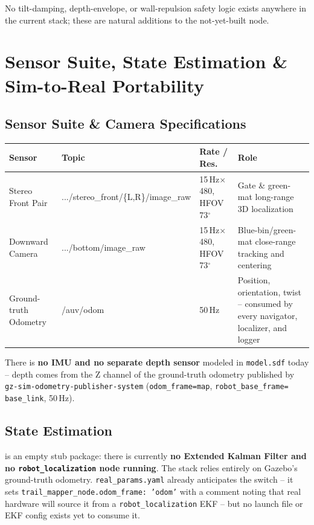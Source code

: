 \documentclass[10.5pt,a4paper]{article}
\newcommand{\hl}[1]{\tikz[baseline=(t.base)]{\node[fill=codeorange,rounded corners=2pt,inner sep=2pt,font=\ttfamily\scriptsize,text=codeorangetxt] (t) {#1};}}
\newcommand{\code}[1]{\texttt{\small\color{accent}#1}}
\begin{document}
No tilt-damping, depth-envelope, or wall-repulsion safety logic exists anywhere in the
current stack; these are natural additions to the not-yet-built \hl{auv\_controls} node.

\section{Sensor Suite, State Estimation \& Sim-to-Real Portability}

\subsection{Sensor Suite \& Camera Specifications}

\begin{table}[H]\centering\small
\begin{tabularx}{\textwidth}{L{2.6cm} L{4.0cm} L{3.1cm} X}
\toprule
{}\textbf{Sensor} & \textbf{Topic} & \textbf{Rate / Res.} & \textbf{Role} \\
\midrule
Stereo Front Pair & \scriptsize\ttfamily .../stereo\_front/\{L,R\}/image\_raw & 15\,Hz$\times$480, HFOV 73$^\circ$ & Gate \& green-mat long-range 3D localization \\
Downward Camera & \scriptsize\ttfamily .../bottom/image\_raw & 15\,Hz$\times$480, HFOV 73$^\circ$ & Blue-bin/green-mat close-range tracking and centering \\
Ground-truth Odometry & \scriptsize\ttfamily /auv/odom & 50\,Hz & Position, orientation, twist -- consumed by every navigator, localizer, and logger \\
\bottomrule
\end{tabularx}
\end{table}

There is \textbf{no IMU and no separate depth sensor} modeled in \code{model.sdf} today --
depth comes from the Z channel of the ground-truth odometry published by
\code{gz-sim-odometry-publisher-system} (\code{odom\_frame=map}, \code{robot\_base\_frame=}
\code{base\_link}, 50\,Hz).

\subsection{State Estimation}

\hl{auv\_sensors} is an empty stub package: there is currently \textbf{no Extended Kalman
Filter and no \code{robot\_localization} node running}. The stack relies entirely on
Gazebo's ground-truth odometry. \code{real\_params.yaml} already anticipates the switch --
it sets \code{trail\_mapper\_node.odom\_frame: 'odom'} with a comment noting that real
hardware will source it from a \code{robot\_localization} EKF -- but no launch file or EKF
config exists yet to consume it.
\end{document}
